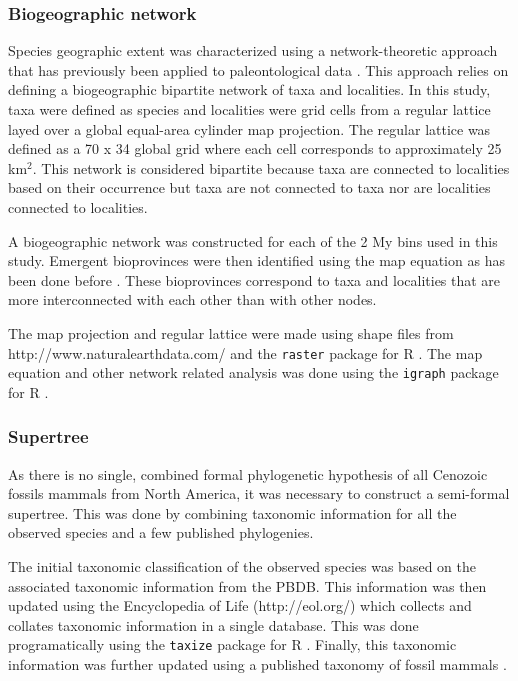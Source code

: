 \documentclass{article}
\begin{document}
\subsubsection{Biogeographic network}
Species geographic extent was characterized using a network-theoretic approach that has previously been applied to paleontological data \cite{Sidor2013,Vilhena2013}. This approach relies on defining a biogeographic bipartite network of taxa and localities. In this study, taxa were defined as species and localities were grid cells from a regular lattice layed over a global equal-area cylinder map projection. The regular lattice was defined as a 70 x 34 global grid where each cell corresponds to approximately 25 km\(^{2}\). This network is considered bipartite because taxa are connected to localities based on their occurrence but taxa are not connected to taxa nor are localities connected to localities.

A biogeographic network was constructed for each of the 2 My bins used in this study. Emergent bioprovinces were then identified using the map equation \cite{Rosvall2008,Rosvall2009a} as has been done before \cite{Sidor2013,Vilhena2013b,Vilhena2013}. These bioprovinces correspond to taxa and localities that are more interconnected with each other than with other nodes.

The map projection and regular lattice were made using shape files from http://www.naturalearthdata.com/ and the \texttt{raster} package for R \cite{raster}. The map equation and other network related analysis was done using the \texttt{igraph} package for R \cite{csardi2006igraph}.


\subsubsection{Supertree}

As there is no single, combined formal phylogenetic hypothesis of all Cenozoic fossils mammals from North America, it was necessary to construct a semi-formal supertree. This was done by combining taxonomic information for all the observed species and a few published phylogenies.

The initial taxonomic classification of the observed species was based on the associated taxonomic information from the PBDB. This information was then updated using the Encyclopedia of Life (http://eol.org/) which collects and collates taxonomic information in a single database. This was done programatically using the \texttt{taxize} package for R \cite{2013taxize}. Finally, this taxonomic information was further updated using a published taxonomy of fossil mammals \cite{Janis2008,Janis1998}. 
\end{document}
